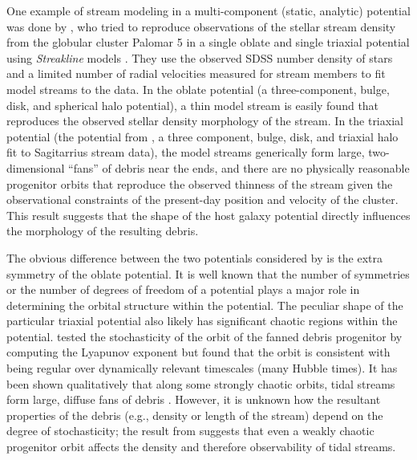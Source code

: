 \documentclass[letterpaper,12pt,preprint]{aastex}
\begin{document}
One example of stream modeling in a multi-component (static, analytic) potential was done by \citet{pearson15}, who tried to reproduce observations of the stellar stream density from the globular cluster Palomar 5 in a single oblate and single triaxial potential using \emph{Streakline} models \citep{kuepper12}. They use the observed SDSS number density of stars and a limited number of radial velocities measured for stream members to fit model streams to the data. In the oblate potential (a three-component, bulge, disk, and spherical halo potential), a thin model stream is easily found that reproduces the observed stellar density morphology of the stream. In the triaxial potential (the potential from \cite{law10}, a three component, bulge, disk, and triaxial halo fit to Sagitarrius stream data), the model streams generically form large, two-dimensional ``fans'' of debris near the ends, and there are no physically reasonable progenitor orbits that reproduce the observed thinness of the stream given the observational constraints of the present-day position and velocity of the cluster. This result suggests that the shape of the host galaxy potential directly influences the morphology of the resulting debris. %

The obvious difference between the two potentials considered by \citet{pearson15} is the extra symmetry of the oblate potential. It is well known that the number of symmetries or the number of degrees of freedom of a potential plays a major role in determining the orbital structure within the potential. The peculiar shape of the particular triaxial potential also likely has significant chaotic regions within the potential. \citet{pearson15} tested the stochasticity of the orbit of the fanned debris progenitor by computing the Lyapunov exponent but found that the orbit is consistent with being regular over dynamically relevant timescales (many Hubble times). It has been shown qualitatively that along some strongly chaotic orbits, tidal streams form large, diffuse fans of debris \citep[e.g.,][]{fardal14}. However, it is unknown how the resultant properties of the debris (e.g., density or length of the stream) depend on the degree of stochasticity; the result from \citet{pearson15} suggests that even a weakly chaotic progenitor orbit affects the density and therefore observability of tidal streams. 
\end{document}
